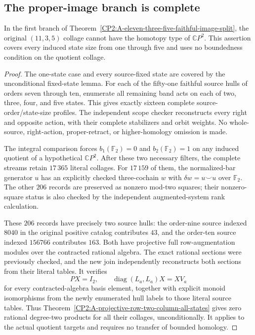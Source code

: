 \subsection{The proper-image branch is complete}

\begin{theorem}
\label{CP2:A-eleven-proper-faithful-images-complete}
In the first branch of
Theorem~\ref{CP2:A-eleven-three-five-faithful-image-split}, the original
$(11,3,5)$ collage cannot have the homotopy type of $\mathbb CP^2$.
This assertion covers every induced state size from one through five
and uses no boundedness condition on the quotient collage.
\end{theorem}
\begin{proof}
The one-state case and every source-fixed state are covered by the
unconditional fixed-state lemma.  For each of the fifty-one faithful
source hulls of orders seven through ten, enumerate all remaining
band acts on each of two, three, four, and five states.  This gives
exactly sixteen complete source-order/state-size profiles.  The
independent scope checker reconstructs every right and opposite
action, with their complete stabilizers and orbit weights.  No
whole-source, right-action, proper-retract, or higher-homology
omission is made.

The integral comparison forces $b_1(\mathbb F_2)=0$ and
$b_2(\mathbb F_2)=1$ on any induced quotient of a hypothetical
$\mathbb CP^2$.  After these two necessary filters, the complete
streams retain $17\,365$ literal collages.  For $17\,159$ of them,
the normalized-bar generator $u$ has an explicitly checked
three-cochain $w$ with $\delta w=u\smile u$ over $\mathbb F_2$.
The other $206$ records are preserved as nonzero mod-two squares;
their nonzero-square status is also checked by the independent
augmented-system rank calculation.

These $206$ records have precisely two source hulls: the order-nine
source indexed $8040$ in the original positive catalog contributes
$43$, and the order-ten source indexed $156766$ contributes $163$.
Both have projective full row-augmentation modules over the
contracted rational algebra.  The exact rational sections were
previously checked, and the new join independently reconstructs
both sections from their literal tables.  It verifies
\[
 PX=I_2,\qquad \operatorname{diag}(L_a,L_a)X=XV_a
\]
for every contracted-algebra basis element, together with explicit
monoid isomorphisms from the newly enumerated hull labels to those
literal source tables.  Thus
Theorem~\ref{CP2:A-projective-row-two-column-all-states} gives zero
rational degree-two products for all their collages, unconditionally.
It applies to the actual quotient targets and requires no transfer
of bounded homology.


\end{proof}
